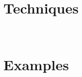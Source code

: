\documentclass[12pt, twoside, openright]{scrbook}
\begin{document}
\chapter{Techniques}\label{secTechniques}
	
	
	
	
	
\	
\chapter{Examples}\label{secExamples}
	
	
	
	
\listoffigures
\listoftables
%
\printglossaries
\printindex
{}
\end{document}
